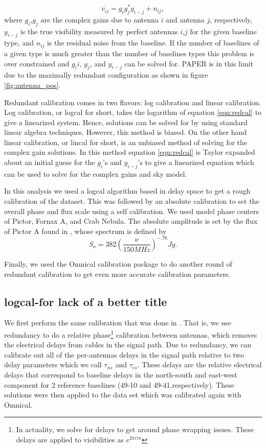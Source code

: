 \documentclass[twocolumn,numberedappendix]{emulateapj}
\begin{document}
\begin{equation}\label{eqn:redcal}
    v_{ij} = g_{i}g_{j}^{*}y_{i-j} + n_{ij},   
\end{equation}
where $g_{i}$,$g_{j}$ are the complex gains due to antenna $i$ and antenna $j$,
respectively, $y_{i-j}$ is the true visibility measured by perfect antennas
$i$,$j$ for the given baseline type, and $n_{ij}$ is the residual noise from
the baseline.  If the number of baselines of a given type is much greater than
the number of baselines types this problem is over constrained and $g_{i}i$,
$g_{j}$, and $y_{i-j}$ can be solved for. PAPER is in this limit due to the
maximally redundant configuration as shown in figure \ref{fig:antenna_pos}. 

Redundant calibration comes in two flavors: log calibration and linear
calibration. Log calibration, or logcal for short, takes the logarithm of
equation \ref{eqn:redcal} to give a linearized system. Hence, solutions can be
solved for by using standard linear algebra techniques. However, this method is
biased. On the other hand linear calibration, or lincal for short, is an
unbiased method of solving for the complex gain solutions. In this method
equation \ref{eqn:redcal} is Taylor expanded about an initial guess for the
$g_{i}$'s and $y_{i-j}$'s to give a linearized equation which can be used to
solve for the complex gains and sky model. 

In this analysis we used a logcal algorithm based in delay space to get a rough
calibration of the dataset. This was followed by an absolute calibration to set
the overall phase and flux scale using a self calibration. We used model phase
centers of Pictor, Fornax A, and Crab Nebula. The absolute amplitude is set
by the flux of Pictor A found in \cite{jacobs_et_al_pictor}, whose spectrum is
defined by 
\begin{equation}
    S_{\nu} = 382(\frac{\nu}{150 MHz})^{-.76} Jy.
\end{equation}

Finally, we used the Omnical calibration package to do another round of
redundant calibration to get even more accurate calibration parameters.

\subsection{logcal-for lack of a better title}
We first perform the same calibration that was
done in \citep{parsons2014}. That is, we use redundancy to do a relative
phase\footnote{In actuality, we solve for delays to get around phase wrapping
issues. These delays are applied to visibilities as $e^{2\pi{i}\tau\nu}$}
calibration between antennas, which removes the electrical delays from cables in
the signal path. Due to redundancy, we can calibrate out all of the per-antennas
delays in the signal path relative to two delay parameters which we call
$\tau_{ns}$ and $\tau_{es}$. These delays are the relative electrical delays
that correspond to baseline delays in the north-south and east-west component
for 2 reference baselines (49-10 and 49-41,respectively). These solutions were
then applied to the data set which was calibrated again with Omnical. 
\end{document}
